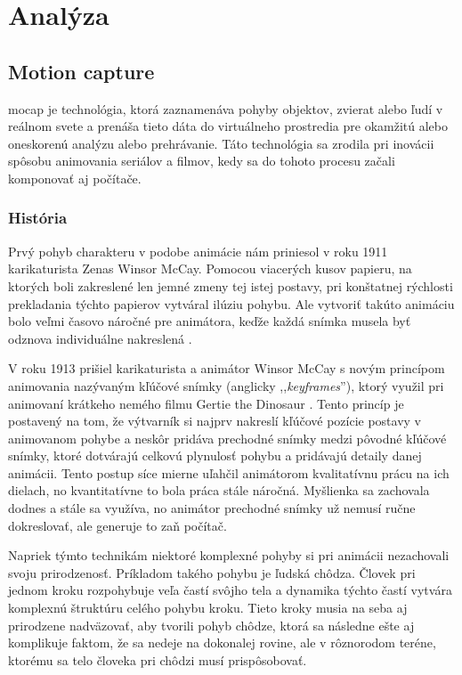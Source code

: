 \section{Analýza}%
\subsection{Motion capture}%

\noindent\acrfull{mocap} je technológia, ktorá zaznamenáva pohyby objektov, zvierat alebo ľudí v reálnom svete a prenáša tieto dáta do virtuálneho prostredia pre okamžitú alebo oneskorenú analýzu alebo prehrávanie. Táto technológia sa zrodila pri inovácii spôsobu animovania seriálov a filmov, kedy sa do tohoto procesu začali komponovať aj počítače.

\subsubsection{História}%

Prvý pohyb charakteru v podobe animácie nám priniesol v roku 1911 karikaturista Zenas Winsor McCay. Pomocou viacerých kusov papieru, na ktorých boli zakreslené len jemné zmeny tej istej postavy, pri konštatnej rýchlosti prekladania týchto papierov vytváral ilúziu pohybu. Ale vytvoriť takúto animáciu bolo veľmi časovo náročné pre animátora, keďže každá snímka musela byť odznova individuálne nakreslená \cite{mocapFundamentals}.

V roku 1913 prišiel karikaturista a animátor Winsor McCay s novým princípom animovania nazývaným kľúčové snímky (anglicky ,,\textit{keyframes}''), ktorý využil pri animovaní krátkeho nemého filmu Gertie the Dinosaur \cite{gertieDino}. Tento princíp je postavený na tom, že výtvarník si najprv nakreslí kľúčové pozície postavy v animovanom pohybe a neskôr pridáva prechodné snímky medzi pôvodné kľúčové snímky, ktoré dotvárajú celkovú plynulosť pohybu a pridávajú detaily danej animácii. Tento postup síce mierne uľahčil animátorom kvalitatívnu prácu na ich dielach, no kvantitatívne to bola práca stále náročná. Myšlienka sa zachovala dodnes a stále sa využíva, no animátor prechodné snímky už nemusí ručne dokreslovať, ale generuje to zaň počítač.  

Napriek týmto technikám niektoré komplexné pohyby si pri animácii nezachovali svoju prirodzenosť. Príkladom takého pohybu je ľudská chôdza. Človek pri jednom kroku rozpohybuje veľa častí svôjho tela a dynamika týchto častí vytvára komplexnú štruktúru celého pohybu kroku. Tieto kroky musia na seba aj prirodzene nadväzovať, aby tvorili pohyb chôdze, ktorá sa následne ešte aj komplikuje faktom, že sa nedeje na dokonalej rovine, ale v rôznorodom teréne, ktorému sa telo človeka pri chôdzi musí prispôsobovať.

